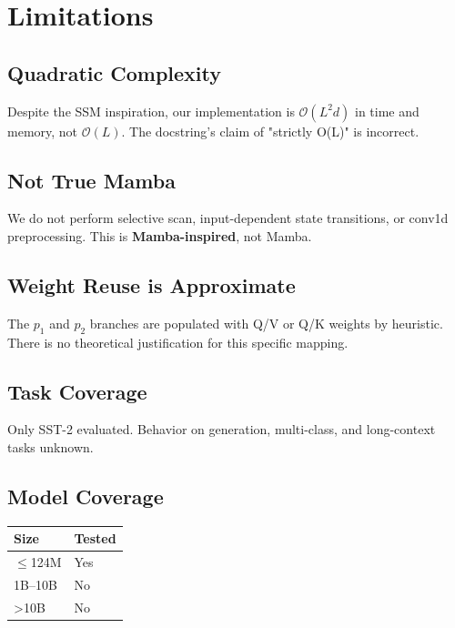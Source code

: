 \section{Limitations}

\subsection{Quadratic Complexity}

Despite the SSM inspiration, our implementation is \textbf{$\mathcal{O}(L^2 d)$} in 
time and memory, not $\mathcal{O}(L)$. The docstring's claim of "strictly 
O(L)" is incorrect.

\subsection{Not True Mamba}

We do not perform selective scan, input-dependent state transitions, or 
conv1d preprocessing. This is \textbf{Mamba-inspired}, not Mamba.

\subsection{Weight Reuse is Approximate}

The $p_1$ and $p_2$ branches are populated with Q/V or Q/K weights by 
heuristic. There is no theoretical justification for this specific mapping.

\subsection{Task Coverage}

Only SST-2 evaluated. Behavior on generation, multi-class, and long-context 
tasks unknown.

\subsection{Model Coverage}

\begin{table}[H]
\centering
\small
\begin{tabular}{ll}
\toprule
\textbf{Size} & \textbf{Tested} \\
\midrule
$\le$124M & Yes \\
1B--10B & No \\
\textgreater{}10B & No \\
\bottomrule
\end{tabular}
\end{table}


